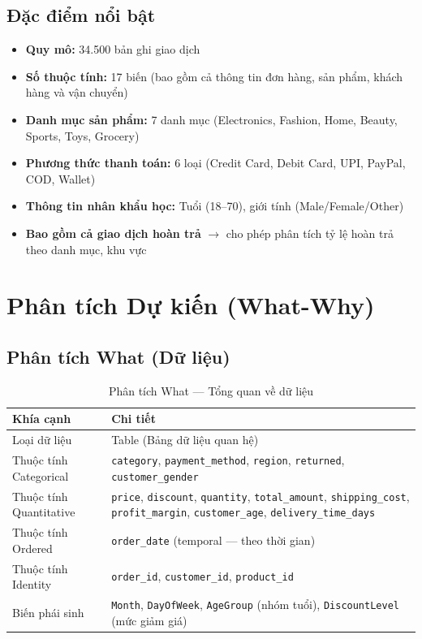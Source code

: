 \documentclass[12pt,a4paper]{article}
\begin{document}
\subsection{Đặc điểm nổi bật}

\begin{itemize}[leftmargin=1.5cm]
    \item \textbf{Quy mô:} 34.500 bản ghi giao dịch
    \item \textbf{Số thuộc tính:} 17 biến (bao gồm cả thông tin đơn hàng, sản phẩm, khách hàng và vận chuyển)
    \item \textbf{Danh mục sản phẩm:} 7 danh mục (Electronics, Fashion, Home, Beauty, Sports, Toys, Grocery)
    \item \textbf{Phương thức thanh toán:} 6 loại (Credit Card, Debit Card, UPI, PayPal, COD, Wallet)
    \item \textbf{Thông tin nhân khẩu học:} Tuổi (18--70), giới tính (Male/Female/Other)
    \item \textbf{Bao gồm cả giao dịch hoàn trả} $\rightarrow$ cho phép phân tích tỷ lệ hoàn trả theo danh mục, khu vực
\end{itemize}

\section{Phân tích Dự kiến (What-Why)}

\subsection{Phân tích What (Dữ liệu)}

\begin{table}[h!]
\centering
\renewcommand{\arraystretch}{1.3}
\begin{tabularx}{\textwidth}{|L{4cm}|X|}
    \hline
    \textbf{Khía cạnh} & \textbf{Chi tiết} \\
    \hline
    Loại dữ liệu & Table (Bảng dữ liệu quan hệ) \\
    \hline
    Thuộc tính Categorical & \texttt{category}, \texttt{payment\_method}, \texttt{region}, \texttt{returned}, \texttt{customer\_gender} \\
    \hline
    Thuộc tính Quantitative & \texttt{price}, \texttt{discount}, \texttt{quantity}, \texttt{total\_amount}, \texttt{shipping\_cost}, \texttt{profit\_margin}, \texttt{customer\_age}, \texttt{delivery\_time\_days} \\
    \hline
    Thuộc tính Ordered & \texttt{order\_date} (temporal --- theo thời gian) \\
    \hline
    Thuộc tính Identity & \texttt{order\_id}, \texttt{customer\_id}, \texttt{product\_id} \\
    \hline
    Biến phái sinh & \texttt{Month}, \texttt{DayOfWeek}, \texttt{AgeGroup} (nhóm tuổi), \texttt{DiscountLevel} (mức giảm giá) \\
    \hline
\end{tabularx}
\caption{Phân tích What --- Tổng quan về dữ liệu}
\end{table}
\end{document}
